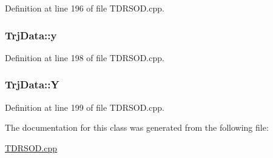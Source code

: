 Definition at line 196 of file T\-D\-R\-S\-O\-D.\-cpp.

\hypertarget{classTrjData_af327a50e035e18f9fd88b538791e8429}{
\subsubsection[{y}]{ Trj\-Data\-::y\hspace{0.3cm}{\ttfamily [private]}}}\label{classTrjData_af327a50e035e18f9fd88b538791e8429}


Definition at line 198 of file T\-D\-R\-S\-O\-D.\-cpp.

\hypertarget{classTrjData_a083880232f61ac9386f6ccb7820811bc}{
\subsubsection[{Y}]{ Trj\-Data\-::\-Y\hspace{0.3cm}{\ttfamily [private]}}}\label{classTrjData_a083880232f61ac9386f6ccb7820811bc}


Definition at line 199 of file T\-D\-R\-S\-O\-D.\-cpp.



The documentation for this class was generated from the following file\-:\begin{DoxyCompactItemize}
\item 
\hyperlink{TDRSOD_8cpp}{T\-D\-R\-S\-O\-D.\-cpp}\end{DoxyCompactItemize}
